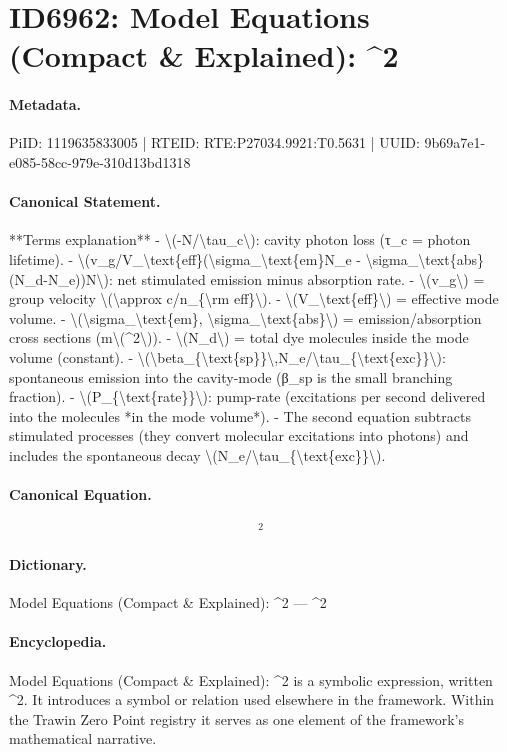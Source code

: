 \section*{ID6962: Model Equations (Compact \& Explained): \textasciicircum{}2}
\paragraph{Metadata.}
PiID: 1119635833005 | RTEID: RTE:P27034.9921:T0.5631 | UUID: 9b69a7e1-e085-58cc-979e-310d13bd1318

\paragraph{Canonical Statement.}
**Terms explanation** - \textbackslash{}(-N/\textbackslash{}tau\_c\textbackslash{}): cavity photon loss (τ\_c = photon lifetime). - \textbackslash{}(v\_g/V\_\textbackslash{}text\{eff\}(\textbackslash{}sigma\_\textbackslash{}text\{em\}N\_e - \textbackslash{}sigma\_\textbackslash{}text\{abs\}(N\_d-N\_e))N\textbackslash{}): net stimulated emission minus absorption rate. - \textbackslash{}(v\_g\textbackslash{}) = group velocity \textbackslash{}(\textbackslash{}approx c/n\_\{\textbackslash{}rm eff\}\textbackslash{}). - \textbackslash{}(V\_\textbackslash{}text\{eff\}\textbackslash{}) = effective mode volume. - \textbackslash{}(\textbackslash{}sigma\_\textbackslash{}text\{em\}, \textbackslash{}sigma\_\textbackslash{}text\{abs\}\textbackslash{}) = emission/absorption cross sections (m\textbackslash{}(\textasciicircum{}2\textbackslash{})). - \textbackslash{}(N\_d\textbackslash{}) = total dye molecules inside the mode volume (constant). - \textbackslash{}(\textbackslash{}beta\_\{\textbackslash{}text\{sp\}\}\textbackslash{},N\_e/\textbackslash{}tau\_\{\textbackslash{}text\{exc\}\}\textbackslash{}): spontaneous emission into the cavity-mode (β\_sp is the small branching fraction). - \textbackslash{}(P\_\{\textbackslash{}text\{rate\}\}\textbackslash{}): pump-rate (excitations per second delivered into the molecules *in the mode volume*). - The second equation subtracts stimulated processes (they convert molecular excitations into photons) and includes the spontaneous decay \textbackslash{}(N\_e/\textbackslash{}tau\_\{\textbackslash{}text\{exc\}\}\textbackslash{}).

\paragraph{Canonical Equation.}
\[
^2
\]

\paragraph{Dictionary.}
Model Equations (Compact \& Explained): \textasciicircum{}2 — \textasciicircum{}2

\paragraph{Encyclopedia.}
Model Equations (Compact \& Explained): \textasciicircum{}2 is a symbolic expression, written \textasciicircum{}2. It introduces a symbol or relation used elsewhere in the framework. Within the Trawin Zero Point registry it serves as one element of the framework's mathematical narrative.
